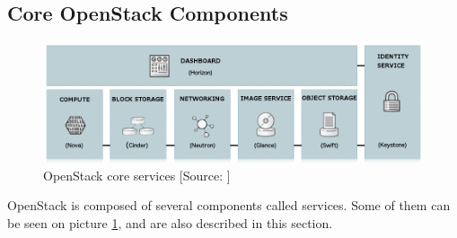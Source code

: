 \subsection{Core OpenStack Components}
\begin{figure}[!h]
  \includegraphics[width=\textwidth]{fig/openstack_services.png}
  \caption{OpenStack core services [Source: \cite{ServicesImageSource}]}
  \label{fig:openstack_services}
\end{figure}
OpenStack is composed of several components \cite{CL210} called services. Some of them can be seen on picture \ref{fig:openstack_services}, and are also described in this section.
